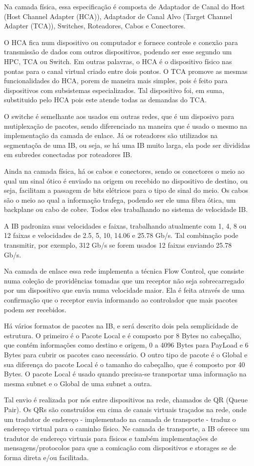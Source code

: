 \documentclass[a4paper,12pt]{article}
\begin{document}
Na camada física, essa especificação é composta de Adaptador de Canal do Host (Host Channel Adapter (HCA)), Adaptador de Canal Alvo (Target Channel Adapter (TCA)), Switches, Roteadores, Cabos e Conectores.

O HCA fica num dispositivo ou computador e fornece controle e conexão para transmissão de dados com outros dispositivos, podendo ser esse segundo um HPC, TCA ou Switch. Em outras palavras, o HCA é o dispositivo físico nas pontas para o canal virtual criado entre dois pontos. O TCA promove as mesmas funcionalidades do HCA, porem de maneira mais simples, pois é feito para dispositivos com subsistemas especializados. Tal dispositivo foi, em suma, substituido pelo HCA pois este atende todas as demandas do TCA.

O switche é semelhante aos usados em outras redes, que é um disposivo para mutiplexação de pacotes, sendo diferenciado na maneira que é usado o mesmo na implementação da camada de enlace. Já os roteadores são utilizados na segmentaçõa de uma IB, ou seja, se há uma IB muito larga, ela pode ser divididas em subredes conectadas por roteadores IB.

Ainda na camada física, há os cabos e conectores, sendo os conectores o meio ao qual um sinal ótico é enviado na origem ou recebido no dispositivo de destino, ou seja, facilitam a passagem de bits elétricos para o tipo de sinal do meio. Os cabos são o meio ao qual a informação trafega, podendo ser ele uma fibra ótica, um backplane ou cabo de cobre. Todos eles trabalhando no sistema de velocidade IB.

A IB padroniza suas velocidades e faixas, trabalhando atualmente com 1, 4, 8 ou 12 faixas e velocidades de 2.5, 5, 10, 14.06 e 25.78 Gb/s. Tal combinação pode transmitir, por exemplo, 312 Gb/s se forem usados 12 faixas enviando 25.78 Gb/s.

Na camada de enlace essa rede implementa a técnica Flow Control, que consiste numa coleção de providências tomadas que um receptor não seja sobrecarregado por um dispositivo que envia numa velocidade maior. Ela é feita através de uma confirmação que o receptor envia informando ao controlador que mais pacotes podem ser recebidos.

Há vários formatos de pacotes na IB, e será descrito dois pela semplicidade de estrutura. O primeiro é o Pacote Local e é composto por 8 Bytes no cabeçalho, que contém informações como destino e origem, 0 a 4096 Bytes para PayLoad e 6 Bytes para cubrir os pacotes caso necessário. O outro tipo de pacote é o Global e sua diferença do pacote Local é o tamanho do cabeçalho, que é composto por 40 Bytes. O pacote Local é usado quando precisa-se transportar uma informação na mesma subnet e o Global de uma subnet a outra.

Tal envio é realizada por nós entre dispositivos na rede, chamados de QR (Queue Pair). Os QRs são construídos em cima de canais virtuais traçados na rede, onde um tradutor de endereço - implementado na camada de transporte - traduz o endereço virtual para o caminho físico. Ne camada de transporte, a IB oferece um tradutor de endereço virtuais para físicos e também implementações de mensagens/protocolos para que a comicação com dispositivos e storages se de forma direta e/ou facilitada.
\end{document}
